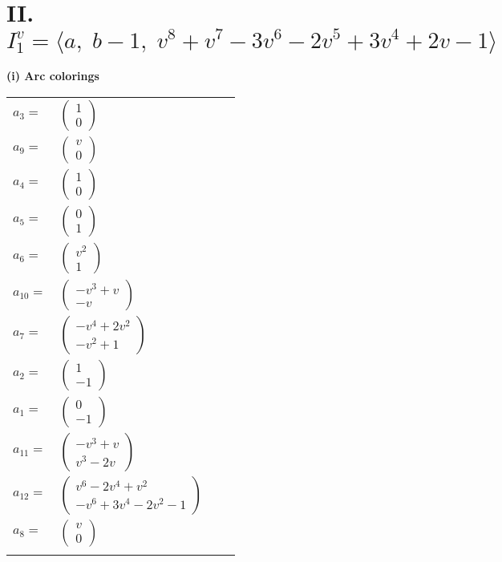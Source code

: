\documentclass[1p]{elsarticle_modified}
\theoremstyle{definition}
\begin{document}
\centering \section*{II. $I^v_{1}= \langle a,\;b-1,\;v^8+v^7-3 v^6-2 v^5+3 v^4+2 v-1 \rangle$}
\flushleft \textbf{(i) Arc colorings}\\
\begin{tabular}{m{7pt} m{180pt} m{7pt} m{180pt} }
\flushright $a_{3}=$&$\begin{pmatrix}1\\0\end{pmatrix}$ \\
\flushright $a_{9}=$&$\begin{pmatrix}v\\0\end{pmatrix}$ \\
\flushright $a_{4}=$&$\begin{pmatrix}1\\0\end{pmatrix}$ \\
\flushright $a_{5}=$&$\begin{pmatrix}0\\1\end{pmatrix}$ \\
\flushright $a_{6}=$&$\begin{pmatrix}v^2\\1\end{pmatrix}$ \\
\flushright $a_{10}=$&$\begin{pmatrix}- v^3+v\\- v\end{pmatrix}$ \\
\flushright $a_{7}=$&$\begin{pmatrix}- v^4+2 v^2\\- v^2+1\end{pmatrix}$ \\
\flushright $a_{2}=$&$\begin{pmatrix}1\\-1\end{pmatrix}$ \\
\flushright $a_{1}=$&$\begin{pmatrix}0\\-1\end{pmatrix}$ \\
\flushright $a_{11}=$&$\begin{pmatrix}- v^3+v\\v^3-2 v\end{pmatrix}$ \\
\flushright $a_{12}=$&$\begin{pmatrix}v^6-2 v^4+v^2\\- v^6+3 v^4-2 v^2-1\end{pmatrix}$ \\
\flushright $a_{8}=$&$\begin{pmatrix}v\\0\end{pmatrix}$\\&\end{tabular}
\end{document}
